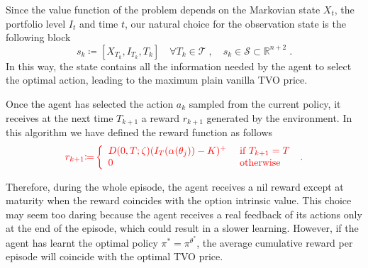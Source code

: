 \documentclass[runningheads]{m2ef}
\newcommand{\change}[1]{{\color{red} {#1}}}%
\begin{document}
	Since the value function of the problem depends on the Markovian state $X_t$, the portfolio level $I_t$ and time $t$, our natural choice for the observation state is the following block
	\begin{equation}
		s_{k} \coloneqq \left[X_{T_k}, I_{T_k}, T_k \right] \quad \forall T_k \in \mathcal{T} \; , \quad s_k \in \mathcal{S} \subset \mathbb{R}^{n+2} \; .
	\label{eq:state}\end{equation}
	In this way, the state contains all the information needed by the agent to select the optimal action, leading to the maximum plain vanilla TVO price. 

	Once the agent has selected the action $a_k$ sampled from the current policy, it receives at the next time $T_{k+1}$ a reward $r_{k+1}$ generated by the environment. In this algorithm we have defined the reward function as follows
	\begin{equation}
		\change{r_{k+1}\change{\coloneqq}\left\{\begin{array}{ll}
			D(0,T;\zeta)(I_T(\alpha(\theta_j)) - K)^+ & \text { if } T_{k+1} = T \\
			0 & \text { otherwise }
		\end{array}\right.
	\label{eq:reward1} \; .} \end{equation}

	Therefore, during the whole episode, the agent receives a nil reward except at maturity when the reward coincides with the option intrinsic value. This choice may seem too daring because the agent receives a real feedback of its actions only at the end of the episode, which could result in a slower learning. However, if the agent has learnt the optimal policy $\pi^* = \pi^{\theta^*}$, the average cumulative reward per episode will coincide with the optimal TVO price.
\end{document}
